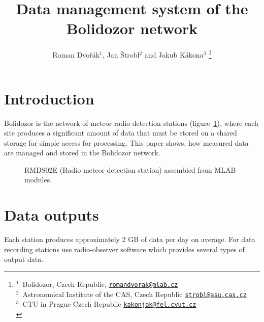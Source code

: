 \documentclass[10pt,a4paper,twoside,dvips]{article}
\begin{document}
\SetPaperBodyFont

\begin{IMCpaper}{
\title{Data management system of the Bolidozor network}
\author{Roman Dvořák$^1$, Jan Štrobl$^2$ and Jakub Kákona$^3$
        \thanks{
				$^1\,$ Bolidozor, Czech Republic,
        				\texttt{\url{romandvorak@mlab.cz}}\\
				$^2\,$ Astronomical Institute of the CAS, Czech Republic
						\texttt{\url{strobl@asu.cas.cz}}\\
				$^3\,$ CTU in Prague Czech Republic
						\texttt{\url{kakonjak@fel.cvut.cz}}\\        
        }}%

}%
\vspace*{-3\baselineskip}

\section{Introduction}
Bolidozor is the network of meteor radio detection stations (figure~\ref{RMDS}), where each site produces a significant amount of data that must be stored on a shared storage for simple access for processing. This paper shows, how measured data are managed and stored in the Bolidozor network.  

\begin{figure}[htb]
\centering
{}
\caption{RMDS02E (Radio meteor detection station) assembled from MLAB modules.}%
\label{RMDS}
\end{figure}                                                 

\section{Data outputs}
Each station produces approximately 2 GB of data per day on average. For data recording stations use radio-observer software which provides several types of output data.                                                                             


\end{IMCpaper}
\end{document}
